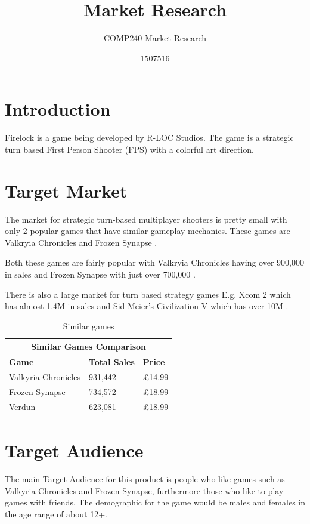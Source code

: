 \documentclass{scrartcl}
\title{Market Research}
\subtitle{COMP240 Market Research}
\author{1507516}
\begin{document}
\maketitle



\section{Introduction}
Firelock is a game being developed by R-LOC Studios. The game is a strategic turn based First Person Shooter (FPS) with a colorful art direction.


\section{Target Market}
The market for strategic turn-based multiplayer shooters is pretty small with only 2 popular games that have similar gameplay mechanics.
These games are Valkryia Chronicles and Frozen Synapse \cite{Valkyria, Frozen}.

 Both these games are fairly popular with Valkryia Chronicles having over 900,000\cite{Valkyria} in sales and Frozen Synapse with just over 700,000 \cite{Frozen}.

There is also a large market for turn based strategy games E.g. Xcom 2\cite{xcom} which has almost 1.4M in sales and Sid Meier's Civilization V which has over 10M \cite{civV}. 

\begin{table}
	\begin{tabular}{ |p{4cm}||p{3cm}|p{3cm}|  }
		 \hline
		 \multicolumn{3}{|c|}{\textbf{Similar Games Comparison}} \\
		 \hline
		 \textbf{Game} & \textbf{Total Sales} & \textbf{Price} \\
		 \hline
		 Valkyria Chronicles   & 931,442    &\pounds 14.99\\
		 Frozen Synapse  & 734,572  & \pounds 18.99  \\
		 Verdun  & 623,081  & \pounds 18.99  \\
		 \hline
	\end{tabular}
	\caption{Similar games}
	\label{table:similar}
\end{table}

\section{ Target Audience}
The main Target Audience for this product is people who like games such as Valkyria Chronicles and Frozen Synapse, furthermore those who like to play games with friends.
The demographic for the game would be males and females in the age range of about 12+. %
\end{document}
